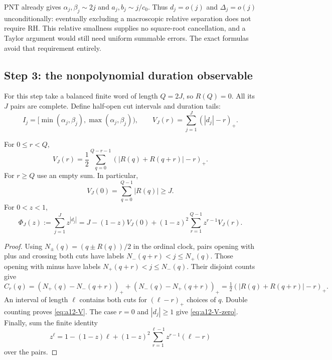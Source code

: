 PNT already gives $\alpha_j,\beta_j\sim2j$ and $a_j,b_j\sim j/c_0$.
Thus $d_j=o(j)$ and $\Delta_j=o(j)$ unconditionally: eventually excluding
a macroscopic relative separation does not require RH. This relative
smallness supplies no square-root cancellation, and a Taylor argument
would still need uniform summable errors. The exact formulas avoid that
requirement entirely.

\subsection{Step 3: the nonpolynomial duration observable}
\label{subsec:a12-duration}
For this step take a balanced finite word of length $Q=2J$, so $R(Q)=0$.
All its $J$ pairs are complete. Define half-open cut intervals and duration tails:
\begin{equation}
\label{eq:a12-halfopen}
I_j=[\min(\alpha_j,\beta_j),\max(\alpha_j,\beta_j)),\qquad
V_J(r)=\sum_{j=1}^J(|d_j|-r)_+.
\end{equation}
\begin{proposition}
\label{prop:a12-two-cut}
For $0\le r<Q$,
\begin{equation}
\label{eq:a12-V}
\boxed{V_J(r)=\frac12\sum_{q=0}^{Q-r-1}
(|R(q)+R(q+r)|-r)_+.}
\end{equation}
For $r\ge Q$ use an empty sum. In particular,
\begin{equation}
\label{eq:a12-V-zero}
V_J(0)=\sum_{q=0}^{Q-1}|R(q)|\ge J.
\end{equation}
For $0<z<1$,
\begin{equation}
\label{eq:a12-Phi}
\Phi_J(z):=\sum_{j=1}^Jz^{|d_j|}
=J-(1-z)V_J(0)+(1-z)^2\sum_{r=1}^{Q-1}z^{r-1}V_J(r).
\end{equation}
\end{proposition}
\begin{proof}
Using $N_\pm(q)=(q\pm R(q))/2$ in the ordinal clock, pairs opening with
plus and crossing both cuts have labels $N_-(q+r)<j\le N_+(q)$.
Those opening with minus have labels $N_+(q+r)<j\le N_-(q)$.
Their disjoint counts give
\begin{equation}
\label{eq:a12-Cr}
C_r(q)=
(N_+(q)-N_-(q+r))_++(N_-(q)-N_+(q+r))_+
=\tfrac12(|R(q)+R(q+r)|-r)_+.
\end{equation}
An interval of length $\ell$ contains both cuts for $(\ell-r)_+$ choices
of $q$. Double counting proves \eqref{eq:a12-V}. The case $r=0$ and
$|d_j|\ge1$ give \eqref{eq:a12-V-zero}.
Finally, sum the finite identity
\begin{equation}
\label{eq:a12-single-duration}
z^\ell=1-(1-z)\ell+
(1-z)^2\sum_{r=1}^{\ell-1}z^{r-1}(\ell-r)
\end{equation}
over the pairs.
\end{proof}

